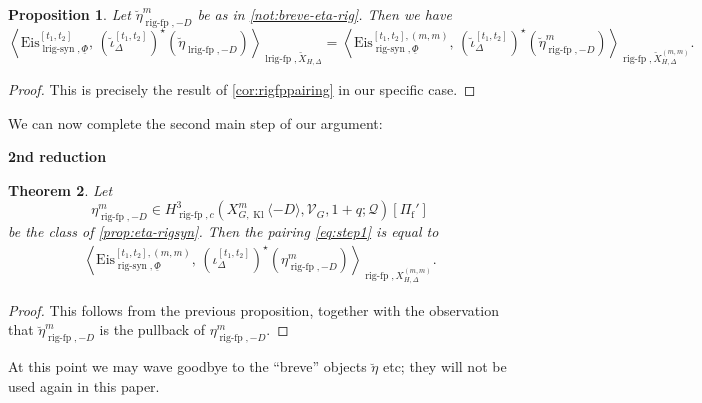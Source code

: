 \documentclass[cjm]{ipart}
\theoremstyle{plain}
\newtheorem{theorem}{Theorem}[subsection]
\newtheorem{proposition}[theorem]{Proposition}
\theoremstyle{remark}
\DeclareMathOperator{\Kl}{Kl}
\DeclareMathOperator{\lrigfp}{lrig-fp}
\DeclareMathOperator{\lrigsyn}{lrig-syn}
\DeclareMathOperator{\rigfp}{rig-fp}
\DeclareMathOperator{\rigsyn}{rig-syn}
\newcommand{\Eis}{\mathrm{Eis}}
\newcommand{\Pif}{\Pi_{\mathrm{f}}}
\newcommand{\cQ}{\mathcal{Q}}
\newcommand{\cV}{\mathcal{V}}
\numberwithin{equation}{subsection}
\begin{document}
  \begin{proposition}
   Let $\breve\eta^{ m}_{\rigfp,-D}$ be as in \cref{not:breve-eta-rig}. Then we have
   \[
    \left\langle \Eis^{[t_1,t_2]}_{\lrigsyn,\underline\Phi}, \,
    (\breve\iota_\Delta^{[t_1,t_2]})^\star(\breve\eta_{\lrigfp,-D})
    \right\rangle_{\lrigfp,\breve{X}_{H,\Delta}}
    = \left\langle
    \Eis^{[t_1,t_2],(m,m)}_{\rigsyn, \underline\Phi},\,
    (\breve\iota_\Delta^{[t_1,t_2]})^\star(\breve\eta^{m}_{\rigfp,-D})
    \right\rangle_{\rigfp,\breve{X}_{H,\Delta}^{(m, m)}}.
   \]
  \end{proposition}

  \begin{proof}
   This is precisely the result of \cref{cor:rigfppairing} in our specific case.
  \end{proof}

  We can now complete the second main step of our argument:\bigskip

  \begin{mdframed}{\bf 2nd reduction}
  \begin{theorem}\label{thm:redtoord}
   Let
   \[
    \eta_{\rigfp, -D}^{m} \in H^3_{\rigfp, c}\left(X_{G,\Kl}^{m}\langle -D\rangle, \cV_G, 1+q;\cQ\right)[\Pif']
   \]
   be the class of \cref{prop:eta-rigsyn}. Then the pairing \eqref{eq:step1} is equal to
   \begin{align*}
    \left\langle \Eis^{[t_1,t_2],(m,m)}_{\rigsyn,\underline\Phi},\, (\iota_\Delta^{[t_1,t_2]})^\star( \eta_{\rigfp,-D}^{m})\right\rangle_{\rigfp, X^{(m, m)}_{H,\Delta}}.
   \end{align*}
  \end{theorem}
  \end{mdframed}

  \begin{proof}
   This follows from the previous proposition, together with the observation that $\breve\eta^{m}_{\rigfp,-D}$ is the pullback of $\eta_{\rigfp,-D}^{m}$.
  \end{proof}

  \begin{remark}
   At this point we may wave goodbye to the ``breve'' objects $\breve{\eta}$ etc; they will not be used again in this paper.
  \end{remark}
\end{document}
